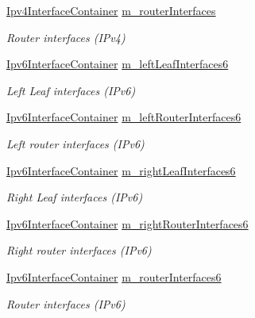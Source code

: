 \begin{DoxyCompactItemize}
\hyperlink{classns3_1_1Ipv4InterfaceContainer}{Ipv4\+Interface\+Container} \hyperlink{classns3_1_1PointToPointDumbbellHelper_a2ff68e8458611b6f7104510f0a3e6e36}{m\+\_\+router\+Interfaces}
\begin{DoxyCompactList}\small\item\em Router interfaces (I\+Pv4) \end{DoxyCompactList}\item 
\hyperlink{classns3_1_1Ipv6InterfaceContainer}{Ipv6\+Interface\+Container} \hyperlink{classns3_1_1PointToPointDumbbellHelper_a03d90f4cb466739f0af2a9f6897095a8}{m\+\_\+left\+Leaf\+Interfaces6}
\begin{DoxyCompactList}\small\item\em Left Leaf interfaces (I\+Pv6) \end{DoxyCompactList}\item 
\hyperlink{classns3_1_1Ipv6InterfaceContainer}{Ipv6\+Interface\+Container} \hyperlink{classns3_1_1PointToPointDumbbellHelper_aa3ba5acbebbee3bfb3e6afbcaf1bc394}{m\+\_\+left\+Router\+Interfaces6}
\begin{DoxyCompactList}\small\item\em Left router interfaces (I\+Pv6) \end{DoxyCompactList}\item 
\hyperlink{classns3_1_1Ipv6InterfaceContainer}{Ipv6\+Interface\+Container} \hyperlink{classns3_1_1PointToPointDumbbellHelper_a06621e96835d870465434c685017942e}{m\+\_\+right\+Leaf\+Interfaces6}
\begin{DoxyCompactList}\small\item\em Right Leaf interfaces (I\+Pv6) \end{DoxyCompactList}\item 
\hyperlink{classns3_1_1Ipv6InterfaceContainer}{Ipv6\+Interface\+Container} \hyperlink{classns3_1_1PointToPointDumbbellHelper_a1d85318b94472667ded096ad2976d641}{m\+\_\+right\+Router\+Interfaces6}
\begin{DoxyCompactList}\small\item\em Right router interfaces (I\+Pv6) \end{DoxyCompactList}\item 
\hyperlink{classns3_1_1Ipv6InterfaceContainer}{Ipv6\+Interface\+Container} \hyperlink{classns3_1_1PointToPointDumbbellHelper_ab0c8369d70e45029783d14678f6fc8ae}{m\+\_\+router\+Interfaces6}
\begin{DoxyCompactList}\small\item\em Router interfaces (I\+Pv6) \end{DoxyCompactList}\end{DoxyCompactItemize}


